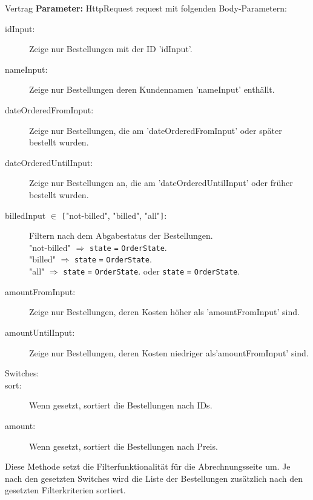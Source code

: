 \documentclass[12pt]{article}
\newcommand{\attribute}[1]{{\color{orange} \texttt{#1}}}
\newcommand{\orderState}[1]{{\color{red}\texttt{OrderState}\color{black}.\color{blue}{#1}}}
\newcommand{\insetContract}{12pt}
\newcommand{\insetMethodDescription}{-0.7cm}
\begin{document}
\begin{contract}{Vertrag}
    \textbf{Parameter:} HttpRequest request mit folgenden Body-Parametern:
    \begin{description}
        \item[\hspace{\insetContract} idInput:] Zeige nur Bestellungen mit der ID 'idInput'.
        \item[\hspace{\insetContract} nameInput:] Zeige nur Bestellungen deren Kundennamen 'nameInput' enthällt.
        \item[\hspace{\insetContract} dateOrderedFromInput:] Zeige nur Bestellungen, die am 'dateOrderedFromInput' oder später bestellt wurden.
        \item[\hspace{\insetContract} dateOrderedUntilInput:] Zeige nur Bestellungen an, die am 'dateOrderedUntilInput' oder früher bestellt wurden.
        \item[\hspace{\insetContract} billedInput $\in $ \texttt{[}"not-billed", "billed", "all"\texttt{]}:] Filtern nach dem Abgabestatus der Bestellungen. \\
        "not-billed" $\Rightarrow$ \attribute{state} \texttt{=} \orderState{FINISHED} \\
        "billed" $\Rightarrow$ \attribute{state} \texttt{=} \orderState{BILLED} \\
        "all" $\Rightarrow$ \attribute{state} \texttt{=} \orderState{FINISHED} oder \attribute{state} \texttt{=} \orderState{BILLED}
        \item[\hspace{\insetContract} amountFromInput:] Zeige nur Bestellungen, deren Kosten höher als 'amountFromInput' sind.
        \item[\hspace{\insetContract} amountUntilInput:] Zeige nur Bestellungen, deren Kosten niedriger als'amountFromInput' sind.
        \item[Switches:]
        \item[\hspace{\insetContract} sort:] Wenn gesetzt, sortiert die Bestellungen nach IDs.   
        \item[\hspace{\insetContract} amount:] Wenn gesetzt, sortiert die Bestellungen nach Preis.
    \end{description}
\end{contract}
\hspace{\insetMethodDescription{}}
Diese Methode setzt die Filterfunktionalität für die Abrechnungsseite um. Je nach den gesetzten Switches wird die Liste der Bestellungen zusätzlich nach den gesetzten Filterkriterien sortiert.
\end{document}
